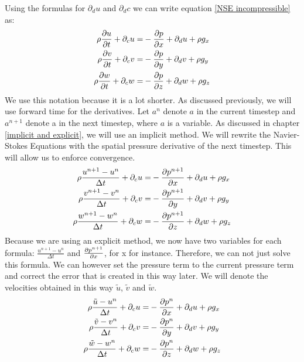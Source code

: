 \documentclass{article}
\begin{document}
Using the formulas for \(\partial _du\) and \(\partial _dc\) we can write equation \ref{NSE incompressible} as\cite{MAC}:
\begin{equation}
\begin{split}
  \rho \pdv{u}{t} + \partial _cu=&-\pdv{p}{x}+\partial _du + \rho g_x\\
  \rho \pdv{v}{t} + \partial _cv=&-\pdv{p}{y}+\partial _dv + \rho g_y\\
  \rho \pdv{w}{t} + \partial _cw=&-\pdv{p}{z}+\partial _dw + \rho g_z
\end{split}
\end{equation}\label{short NSE}We use this notation because it is a lot shorter. As discussed previously, we will use forward time for the derivatives. Let \(a^n\) denote $a$ in the current timestep and \(a^{n+1}\) denote a in the next timestep, where $a$ is a variable. As discussed in chapter \ref{implicit and explicit}, we will use an implicit method. We will rewrite the Navier-Stokes Equations with the spatial pressure derivative of the next timestep. This will allow us to enforce convergence. \cite{MAC}
\begin{equation}
\begin{split}
  \rho \frac{u^{n+1}-u^n}{\Delta t} + \partial _cu=&-\pdv{p^{n+1}}{x}+\partial _du + \rho g_x\\
  \rho \frac{v^{n+1}-v^n}{\Delta t} + \partial _cv=&-\pdv{p^{n+1}}{y}+\partial _dv + \rho g_y\\
  \rho \frac{w^{n+1}-w^n}{\Delta t} + \partial _cw=&-\pdv{p^{n+1}}{z}+\partial _dw + \rho g_z
\end{split}\label{time discretised NSE}
\end{equation} 
Because we are using an explicit method, we now have two variables for each formula: \(\frac{u^{n+1}-u^n}{\Delta t}\) and \(\pdv{p^{n+1}}{x}\), for x for instance. Therefore, we can not just solve this formula. We can however set the pressure term to the current pressure term and correct the error that is created in this way later. We will denote the velocities obtained in this way \(\tilde{u}\), \(\tilde{v}\) and \(\tilde{w}\)\cite{MAC}.
\begin{equation}
\begin{split}
  \rho \frac{\tilde{u}-u^n}{\Delta t} + \partial _cu=&-\pdv{p^{n}}{x}+\partial _du + \rho g_x\\
  \rho \frac{\tilde{v}-v^n}{\Delta t} + \partial _cv=&-\pdv{p^{n}}{y}+\partial _dv + \rho g_y\\
  \rho \frac{\tilde{w}-w^n}{\Delta t} + \partial _cw=&-\pdv{p^{n}}{z}+\partial _dw + \rho g_z
\end{split}\label{guess NSE}
\end{equation} 
\end{document}
